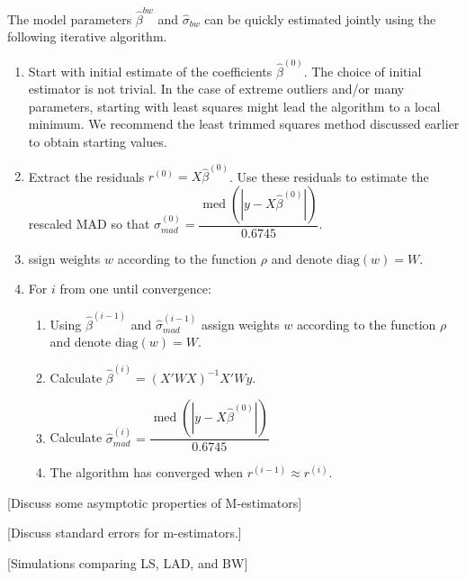 \documentclass[12pt]{article}
\DeclareMathOperator{\med}{med}
\begin{document}
The model parameters $\hat{\beta}^{bw}$ and $\hat{\sigma}_{bw}$ can be quickly estimated jointly using the following iterative algorithm.
\begin{enumerate}
\item Start with initial estimate of the coefficients $\hat{\beta}^{(0)}$. The choice of initial estimator is not trivial. In the case of extreme outliers and/or many parameters, starting with least squares might lead the algorithm to a local minimum. We recommend the least trimmed squares method discussed earlier to obtain starting values.
\item Extract the residuals $r^{(0)} = X\hat{\beta}^{(0)}$. Use these residuals to estimate the rescaled MAD so that $\hat{\sigma}^{(0)}_{mad} = \dfrac{\med\left( |y - X\hat{\beta}^{(0)}|\right)}{0.6745}$.
\item ssign weights $w$ according to the function $\rho$ and denote $\text{diag}(w) = W$.
\item For $i$ from one until convergence:
	\begin{enumerate}
	\item Using $\hat{\beta}^{(i-1)}$ and $\hat{\sigma}^{(i-1)}_{mad}$ assign weights $w$ according to the function $\rho$ and denote $\text{diag}(w) = W$.
	\item Calculate $\hat{\beta}^{(i)} = (X'WX)^{-1}X'Wy$.
	\item Calculate $\hat{\sigma}^{(i)}_{mad} = \dfrac{\med\left( |y - X\hat{\beta}^{(0)}|\right)}{0.6745}$
	\item The algorithm has converged when $r^{(i-1)} \approx r^{(i)}$.
	\end{enumerate}
\end{enumerate}

[Discuss some asymptotic properties of M-estimators]

[Discuss standard errors for m-estimators.]

[Simulations comparing LS, LAD, and BW]
\end{document}
